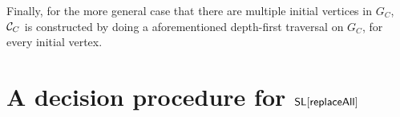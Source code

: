 \documentclass{llncs}
\begin{document}
Finally, for the more general case that there are multiple initial vertices in $G_C$, $\mathcal{C}_C$ is constructed by doing a aforementioned depth-first traversal on $G_C$, for every initial vertex.


\begin{example}
\end{example}



%
%


\section{A decision procedure for $\mathsf{SL}[\mathsf{replaceAll}]$}
\end{document}
